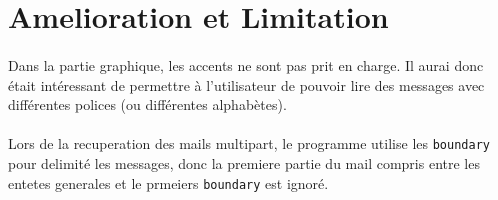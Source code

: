 \documentclass[a4paper, titlepage, oneside, 12pt]{article}%
\begin{document}
\section{Amelioration et Limitation}
\paragraph{}
Dans la partie graphique, les accents ne sont pas prit en charge. Il aurai donc était intéressant de permettre à l'utilisateur de pouvoir lire des messages avec différentes polices (ou différentes alphabètes). 
\paragraph{}
Lors de la recuperation des mails multipart, le programme utilise les \texttt{boundary} pour delimité les messages, donc la premiere partie du mail compris entre les entetes generales et le prmeiers \texttt{boundary} est ignoré. 
\end{document}
